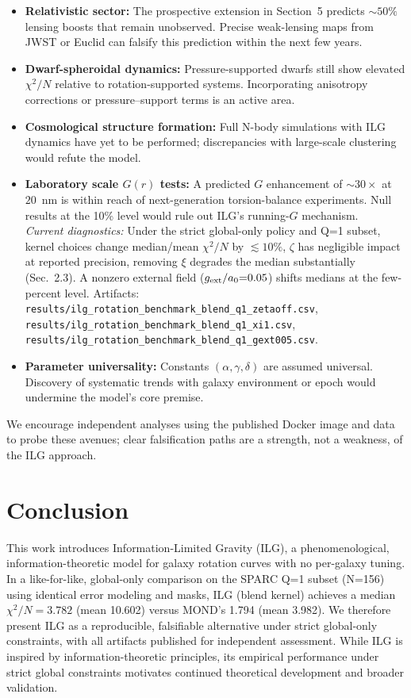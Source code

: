 \documentclass[fleqn,usenatbib]{mnras}
\begin{document}
\begin{itemize}
  \item \textbf{Relativistic sector:} The prospective extension in Section~5 predicts $\sim 50\%$ lensing boosts that remain unobserved.  Precise weak-lensing maps from JWST or Euclid can falsify this prediction within the next few years.
  \item \textbf{Dwarf-spheroidal dynamics:} Pressure-supported dwarfs still show elevated $\chi^2/N$ relative to rotation-supported systems.  Incorporating anisotropy corrections or pressure–support terms is an active area.
  \item \textbf{Cosmological structure formation:} Full N-body simulations with ILG dynamics have yet to be performed; discrepancies with large-scale clustering would refute the model.
  \item \textbf{Laboratory scale $G(r)$ tests:} A predicted $G$ enhancement of $\sim 30\times$ at $20$~nm is within reach of next-generation torsion-balance experiments.  Null results at the 10\% level would rule out ILG's running-$G$ mechanism.\\
  \textit{Current diagnostics:} Under the strict global-only policy and Q=1 subset, kernel choices change median/mean $\chi^2/N$ by $\lesssim 10\%$, $\zeta$ has negligible impact at reported precision, removing $\xi$ degrades the median substantially (Sec.~2.3). A nonzero external field ($g_{\rm ext}/a_0{=}0.05$) shifts medians at the few-percent level. Artifacts: \texttt{results/ilg\_rotation\_benchmark\_blend\_q1\_zetaoff.csv}, \texttt{results/ilg\_rotation\_benchmark\_blend\_q1\_xi1.csv}, \texttt{results/ilg\_rotation\_benchmark\_blend\_q1\_gext005.csv}.
  \item \textbf{Parameter universality:} Constants $(\alpha, \gamma, \delta)$ are assumed universal.  Discovery of systematic trends with galaxy environment or epoch would undermine the model's core premise.
\end{itemize}

We encourage independent analyses using the published Docker image and data to probe these avenues; clear falsification paths are a strength, not a weakness, of the ILG approach.

\section{Conclusion}

This work introduces Information-Limited Gravity (ILG), a phenomenological, information-theoretic model for galaxy rotation curves with no per-galaxy tuning. In a like-for-like, global-only comparison on the SPARC Q=1 subset (N=156) using identical error modeling and masks, ILG (blend kernel) achieves a median $\chi^2/N = 3.782$ (mean 10.602) versus MOND's 1.794 (mean 3.982). We therefore present ILG as a reproducible, falsifiable alternative under strict global-only constraints, with all artifacts published for independent assessment.
While ILG is inspired by information-theoretic principles, its empirical performance under strict global constraints motivates continued theoretical development and broader validation.
\end{document}
